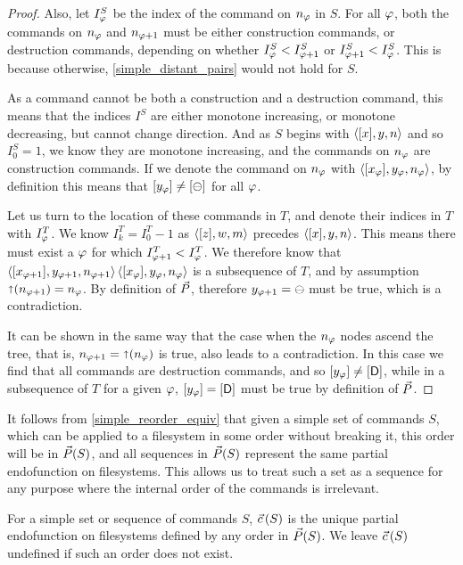 \begin{proof}
Also, let $I^S_\varphi$ be the index of the command on $n_\varphi$ in $S$.
For all $\varphi$, both the commands on $n_\varphi$ and $n_{\varphi+1}$ must be either
construction commands, or destruction commands, depending on
whether $I^S_\varphi<I^S_{\varphi+1}$ or $I^S_{\varphi+1}<I^S_\varphi$.
This is because otherwise, \cref{simple_distant_pairs} would not hold for $S$.

As a command cannot be both a construction and a destruction command,
this means that the indices $I^S$ are either monotone increasing, or monotone
decreasing, but cannot change direction.
And as $S$ begins with $\langle{[x],y,n}\rangle$ and so $I^S_0=1$, we know they are monotone increasing,
and the commands on $n_\varphi$ are construction commands.
If we denote the command on $n_\varphi$ with $\langle{[x_\varphi],y_\varphi,n_\varphi}\rangle$,
by definition this means that $[y_\varphi]\neq[\ominus]$ for all $\varphi$.

Let us turn to the location of these commands in $T$,
and denote their indices in $T$ with $I^T_\varphi$.
We know $I^T_k=I^T_0-1$ as $\langle{[z],w,m}\rangle$ precedes $\langle{[x],y,n}\rangle$.
This means there must exist a $\varphi$ for which $I^T_{\varphi+1}<I^T_\varphi$.
We therefore know that
$\langle{[x_{\varphi+1}],y_{\varphi+1},n_{\varphi+1}}\rangle \, \langle{[x_\varphi],y_\varphi,n_\varphi}\rangle$
is a subsequence of $T$, and by assumption $\mathord{\shortuparrow}({n_{\varphi+1}})=n_\varphi$.
By definition of $\vec{P}$, therefore $y_{\varphi+1}=\ominus$ must be true,
which is a contradiction.

It can be shown in the same way
that the case when the $n_\varphi$ nodes ascend the tree,
that is, $n_{\varphi+1}=\mathord{\shortuparrow}({n_\varphi})$ is true, also leads to a contradiction.
In this case we find that all commands are destruction commands,
and so $[y_\varphi]\neq[\mathsf{D}]$, while in a subsequence of $T$ for a given $\varphi$,
$[y_\varphi]=[\mathsf{D}]$ must be true by definition of $\vec{P}$.
\end{proof}


It follows from \cref{simple_reorder_equiv} that given a simple set of commands $S$,
which can be applied to a filesystem in some order without breaking it,
this order will be in $\vec{P}({S})$,
and all sequences in $\vec{P}({S})$
represent the same partial endofunction on filesystems.
This allows us to treat such a set as a sequence for any purpose
where the internal order of the commands is irrelevant.
\begin{mydef}[$\ordp{S}$]
For a simple set or sequence of commands $S$,
$\ordp{S}$ is the unique partial endofunction on filesystems
defined by any order in $\vec{P}({S})$.
We leave $\ordp{S}$ undefined if such an order does not exist.
\end{mydef}
